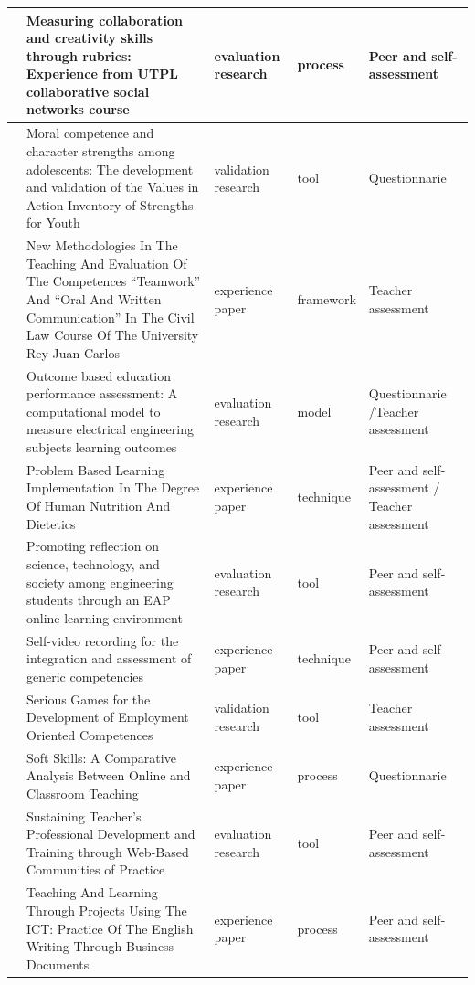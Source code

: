 \begin{landscape}
\begin{center}
\begin{longtable}{| m{2.5cm} | m{9cm} | m{4cm} | m{2.5cm} | m{3.5cm} |}
    \hline
    \cite{piedra2010measuring} & Measuring collaboration and creativity skills through rubrics: Experience from UTPL collaborative social networks course & evaluation research & process & Peer and self-assessment \\
    \hline
    \cite{park2006moral} & Moral competence and character strengths among adolescents: The development and validation of the Values in Action Inventory of Strengths for Youth & validation research & tool & Questionnarie \\
    \hline
    \cite{martin2010new} & New Methodologies In The Teaching And Evaluation Of The Competences “Teamwork” And “Oral And Written Communication” In The Civil Law Course Of The University Rey Juan Carlos & experience paper & framework & Teacher assessment \\
    \hline
    \cite{a2007outcome} & Outcome based education performance assessment: A computational model to measure electrical engineering subjects learning outcomes & evaluation research & model & Questionnarie /Teacher assessment \\
    \hline
    \cite{lasa2013problem} & Problem Based Learning Implementation In The Degree Of Human Nutrition And Dietetics & experience paper & technique & Peer and self-assessment / Teacher assessment \\
    \hline
    \cite{arno2011promoting} & Promoting reflection on science, technology, and society among engineering students through an EAP online learning environment & evaluation research & tool & Peer and self-assessment \\
    \hline
    \cite{masip2013self} & Self-video recording for the integration and assessment of generic competencies & experience paper & technique & Peer and self-assessment \\
    \hline
    \cite{guenaga2013serious} & Serious Games for the Development of Employment Oriented Competences & validation research & tool & Teacher assessment \\
    \hline
    \cite{ruizacarate2013soft} & Soft Skills: A Comparative Analysis Between Online and Classroom Teaching & experience paper & process & Questionnarie \\
    \hline
    \cite{starcic2008sustaining} & Sustaining Teacher's Professional Development and Training through Web-Based Communities of Practice & evaluation research & tool & Peer and self-assessment \\
    \hline
    \cite{renau2010teaching} & Teaching And Learning Through Projects Using The ICT: Practice Of The English Writing Through Business Documents & experience paper & process & Peer and self-assessment \\

\end{longtable}
\end{center}
\end{landscape}
